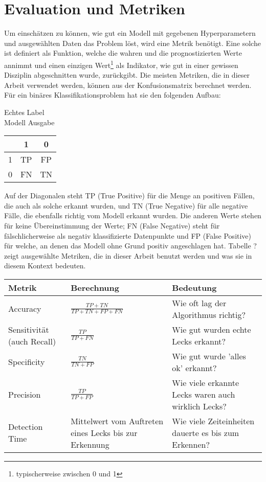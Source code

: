 \section{Evaluation und Metriken}

Um einschätzen zu können, wie gut ein Modell mit gegebenen Hyperparametern und ausgewählten Daten das Problem
 löst, wird eine Metrik benötigt. Eine solche ist definiert als Funktion, welche die wahren und die
 prognostizierten Werte annimmt und einen einzigen Wert\footnote{typischerweise zwischen 0 und 1} als
 Indikator, wie gut in einer gewissen Disziplin abgeschnitten wurde, zurückgibt. Die meisten Metriken,
 die in dieser Arbeit verwendet werden, können aus der Konfusionsmatrix berechnet werden. Für ein binäres
 Klassifikationsproblem hat sie den folgenden Aufbau:

\begin{center}
    \hspace{3.1cm}Echtes Label \\ Modell Ausgabe
    \begin{tabular}{ c | c c | }
      & 1 & 0 \\ 
     \hline
     1 & TP & FP \\  
     0 & FN & TN \\
     \hline  
    \end{tabular}
\end{center}

Auf der Diagonalen steht TP (True Positive) für die Menge an positiven Fällen, die auch als solche erkannt
 wurden, und TN (True Negative) für alle negative Fälle, die ebenfalls richtig vom Modell erkannt wurden.
 Die anderen Werte stehen für keine Übereinstimmung der Werte; FN (False Negative) steht für fälschlicherweise
 als negativ klassifizierte Datenpunkte und FP (False Positive) für welche, an denen das Modell ohne Grund
 positiv angeschlagen hat. Tabelle ? zeigt ausgewählte Metriken, die in dieser Arbeit benutzt werden und was sie
 in diesem Kontext bedeuten.

 \renewcommand{\arraystretch}{2}
\begin{tabular}{ m{6em} m{7em} m{16em} }
    Metrik & Berechnung & Bedeutung \\
    \hline
    Accuracy              & $\frac{TP+TN}{TP+TN+FP+FN}$ & Wie oft lag der Algorithmus richtig? \\
    Sensitivität (auch Recall) & $\frac{TP}{TP+FN}$          & Wie gut wurden echte Lecks erkannt? \\
    Specificity           & $\frac{TN}{TN+FP}$          & Wie gut wurde 'alles ok' erkannt? \\
    Precision             & $\frac{TP}{TP+FP}$          & Wie viele erkannte Lecks waren auch wirklich Lecks? \\
    Detection Time        & Mittelwert vom Auftreten eines Lecks bis zur Erkennung & Wie viele Zeiteinheiten dauerte es bis zum Erkennen?
\end{tabular}

